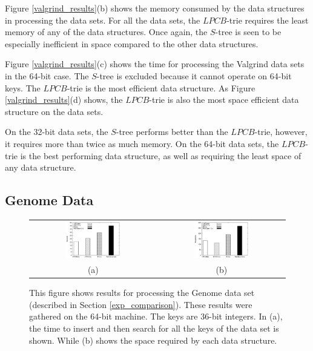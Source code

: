\documentclass[]{acmtrans2m}
\begin{document}
Figure \ref{valgrind_results}(b)
shows the memory consumed by the data structures in processing the data sets. For all the data sets, the $LPCB$-trie
requires the least memory of any of the data structures. Once again, the $S$-tree is seen to be especially inefficient in space
compared to the other data structures.

Figure \ref{valgrind_results}(c) shows the time for processing the Valgrind data sets in the 64-bit case. The $S$-tree
is excluded because it cannot operate on 64-bit keys. The $LPCB$-trie is the most efficient data structure. 
As Figure \ref{valgrind_results}(d) shows, the $LPCB$-trie is also the most space efficient data structure on the data sets. 

On the 32-bit data sets, the $S$-tree performs better than the $LPCB$-trie, however, it requires more than twice as much memory.
On the 64-bit data sets, the $LPCB$-trie is the best performing data structure, as well as requiring the least space of
any data structure.

\subsection{Genome Data}

\begin{figure}
\begin{tabular}{cc}
\includegraphics[width=0.45\textwidth]{plots/athena_36_genome_time.eps} & \includegraphics[width=0.45\textwidth]{plots/athena_36_genome_mem.eps}\\
(a) & (b)
\end{tabular}
\caption{This figure shows results for processing the Genome data set (described in Section \ref{exp_comparison}). 
These results were gathered on the 64-bit machine. The keys are 36-bit integers. In (a), the time to insert and then search
for all the keys of the data set is shown. While (b) shows the space required by each data structure.}
\label{athena_genome_36_fig}
\end{figure}
\end{document}
